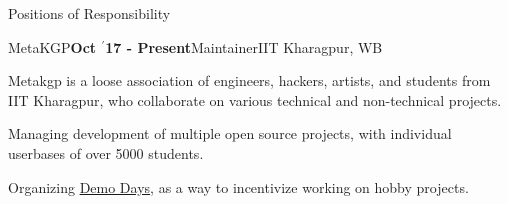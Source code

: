 \documentclass{resume} %
\begin{document}
\begin{rSection}{Positions of Responsibility}

\begin{rSubsection}{\large MetaKGP}{\textbf{\large Oct $^{\prime}$17 - Present}}{Maintainer}{IIT Kharagpur, WB}
\item Metakgp is a loose association of engineers, hackers, artists, and students from IIT Kharagpur, who collaborate on various technical and non-technical projects.
\item Managing development of multiple open source projects, with individual userbases of over 5000 students.
\item Organizing \href{https://www.youtube.com/watch?v=srH_yJJFK80&list=PLxBVN59ffbfKmADdIpkNCs4jfxJ-Nyhqx}{Demo Days}, as a way to incentivize working on hobby projects.
\end{rSubsection}





\end{rSection}
\end{document}
